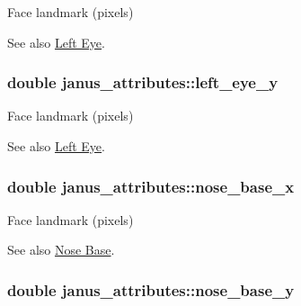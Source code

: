 Face landmark (pixels) 

\begin{DoxySeeAlso}{See also}
\hyperlink{group__janus_left_eye}{Left Eye}. 
\end{DoxySeeAlso}
\hypertarget{structjanus__attributes_a4043fc12a8a499682eb19b6443191fd3}{}
\subsubsection[{left\+\_\+eye\+\_\+y}]{\setlength{\rightskip}{0pt plus 5cm}double janus\+\_\+attributes\+::left\+\_\+eye\+\_\+y}\label{structjanus__attributes_a4043fc12a8a499682eb19b6443191fd3}


Face landmark (pixels) 

\begin{DoxySeeAlso}{See also}
\hyperlink{group__janus_left_eye}{Left Eye}. 
\end{DoxySeeAlso}
\hypertarget{structjanus__attributes_abadc5972a69fe84ae6ff9ef71af310dc}{}
\subsubsection[{nose\+\_\+base\+\_\+x}]{\setlength{\rightskip}{0pt plus 5cm}double janus\+\_\+attributes\+::nose\+\_\+base\+\_\+x}\label{structjanus__attributes_abadc5972a69fe84ae6ff9ef71af310dc}


Face landmark (pixels) 

\begin{DoxySeeAlso}{See also}
\hyperlink{group__janus_nose_base}{Nose Base}. 
\end{DoxySeeAlso}
\hypertarget{structjanus__attributes_a293b37a1a04c09d26b23b8f60f3f1e57}{}
\subsubsection[{nose\+\_\+base\+\_\+y}]{\setlength{\rightskip}{0pt plus 5cm}double janus\+\_\+attributes\+::nose\+\_\+base\+\_\+y}\label{structjanus__attributes_a293b37a1a04c09d26b23b8f60f3f1e57}


